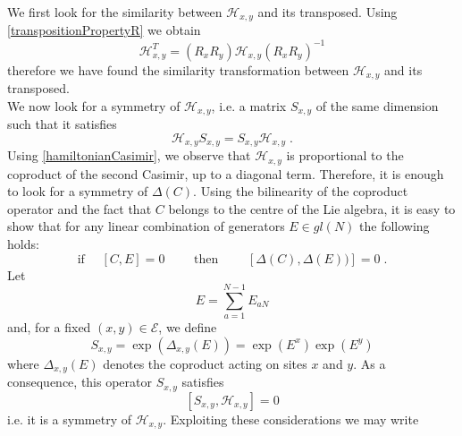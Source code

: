 \documentclass[10pt]{article}
\numberwithin{equation}{section}
\numberwithin{equation}{subsection}
\newcommand{\dt}{\;.}
\begin{document}
We first look for the similarity between $\mathcal{H}_{x,y}$ and its transposed. Using \eqref{transpositionPropertyR} we obtain  
\begin{equation}\label{transpositionPropertyH}
    \mathcal{H}_{x,y}^{T}=\left(R_{x}R_{y}\right)\mathcal{H}_{x,y}\left(R_{x}R_{y}\right)^{-1}
\end{equation}
therefore we have found the similarity transformation between $\mathcal{H}_{x,y}$ and its transposed. \\
We now look for a symmetry of $\mathcal{H}_{x,y}$, i.e. a matrix $S_{x,y}$ of the same dimension such that it satisfies 
\begin{equation}
	\mathcal{H}_{x,y}S_{x,y}=S_{x,y}\mathcal{H}_{x,y}
	\dt
\end{equation}
Using \eqref{hamiltonianCasimir}, we observe that $\mathcal{H}_{x,y}$ is proportional to the coproduct of the second Casimir, up to a diagonal term. Therefore, it is enough to look for a symmetry of $\Delta (C)$. Using the bilinearity of the coproduct operator and the fact that $C$ belongs to the centre of the Lie algebra, it is easy to show that for any linear combination of generators $E\in {gl}(N)$ the following holds:
\begin{equation}
 \text{if } \quad	[C,E]=0\qquad  \text{ then }\qquad \left[\Delta (C),\Delta(E)) \right]=0\dt
\end{equation}
Let
\begin{equation}
	E=\sum_{a=1}^{N-1}E_{aN}
\end{equation}
and, for a fixed $(x,y)\in \mathcal{E}$, we define
\begin{equation}
	S_{x,y}=\exp{(\Delta_{x,y}(E))}=\exp{(E^{x})}\exp{(E^{y})}
\end{equation}
where $\Delta_{x,y}(E)$ denotes the coproduct acting on sites $x$ and $y$. As a consequence, this operator $S_{x,y}$ satisfies
\begin{equation}\label{symmetryH}
	\left[S_{x,y},\mathcal{H}_{x,y}\right]=0
\end{equation}
i.e. it is a symmetry of $\mathcal{H}_{x,y}$. Exploiting these considerations we may write
\end{document}
